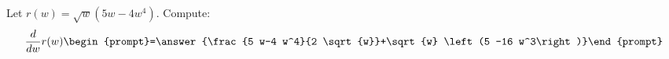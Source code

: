 \documentclass{ximera}
\author{Bart Snapp}
\begin{document}
\begin{exercise}
Let $r(w) = \sqrt{w} \left(5 w-4 w^4\right)$. Compute:
\[
\dd{w}r(w)
\begin{prompt}=\answer{\frac{5 w-4 w^4}{2 \sqrt{w}}+\sqrt{w} \left(5 -16 w^3\right)}\end{prompt}
\]
\end{exercise}
\end{document}
